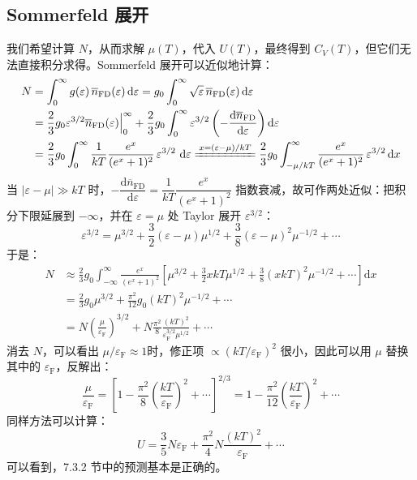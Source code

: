 \subsection{Sommerfeld 展开}
我们希望计算 $N$，从而求解 $\mu(T)$，代入 $U(T)$，最终得到 $C_V(T)$，但它们无法直接积分求得。Sommerfeld 展开可以近似地计算：
\begin{equation}
    \begin{split}
        N
        &=\int_0^{\infty}g(\varepsilon)\,\overline n_{\mathrm{FD}}(\varepsilon)\,\mathrm{d}\varepsilon
        =g_0\int_0^{\infty}\sqrt{\varepsilon}\,\overline n_{\mathrm{FD}}(\varepsilon)\,\mathrm{d}\varepsilon\\
        &=\frac{2}{3}g_0\varepsilon^{3/2}\overline n_{\mathrm{FD}}(\varepsilon)\Big|_0^{\infty}+\frac{2}{3}g_0\int_0^{\infty}\varepsilon^{3/2}\left(-\frac{\mathrm{d}\overline n_{\mathrm{FD}}}{\mathrm{d}\varepsilon}\right)\mathrm{d}\varepsilon\\
        &=\frac{2}{3}g_0\int_0^{\infty}\frac{1}{kT}\frac{e^x}{(e^x+1)^2}\,\varepsilon^{3/2}\,\,\mathrm{d}\varepsilon \xlongequal{x=(\varepsilon-\mu)/kT}\frac{2}{3}g_0\int_{-\mu/kT}^{\infty}\frac{e^x}{(e^x+1)^2}\,\varepsilon^{3/2}\,\mathrm{d}x
    \end{split}
\end{equation}
当 $|\varepsilon-\mu|\gg kT$ 时，$-\dfrac{\mathrm{d}\overline n_{\mathrm{FD}}}{\mathrm{d}\varepsilon}=\dfrac{1}{kT}\dfrac{e^x}{(e^x+1)^2}$ 指数衰减，故可作两处近似：把积分下限延展到 $-\infty$，并在 $\varepsilon=\mu$ 处 Taylor 展开 $\varepsilon^{3/2}$：
\begin{equation}
    \varepsilon^{3/2}=\mu^{3/2}+\frac{3}{2}(\varepsilon-\mu)\mu^{1/2}+\frac{3}{8}(\varepsilon-\mu)^2\mu^{-1/2}+\cdots
\end{equation}
于是：
\begin{equation}
    \begin{split}
        N
        &\approx \frac{2}{3}g_0\int_{-\infty}^{\infty}\frac{e^x}{(e^x+1)^2}\left[\mu^{3/2}+\frac{3}{2}xkT\mu^{1/2}+\frac{3}{8}(xkT)^2\mu^{-1/2}+\cdots\right]\mathrm{d}x\\
        &=\frac{2}{3}g_0\mu^{3/2}+\frac{\pi^2}{12}g_0(kT)^2\mu^{-1/2}+\cdots\\
        &= N\left(\frac{\mu}{\varepsilon_\mathrm{F}}\right)^{3/2}+N\frac{\pi^2}{8}\frac{(kT)^2}{\varepsilon_\mathrm{F}^{3/2}\mu^{1/2}}+\cdots
    \end{split}
\end{equation}
消去 $N$，可以看出 $\mu/\varepsilon_\mathrm{F}\approx 1$时，修正项 $\propto (kT/\varepsilon_\mathrm{F})^2$ 很小，因此可以用 $\mu$ 替换其中的 $\varepsilon_\mathrm{F}$，反解出：
\begin{equation}
    \frac{\mu}{\varepsilon_\mathrm{F}}=\left[1-\frac{\pi^2}{8}\left(\frac{kT}{\varepsilon_\mathrm{F}}\right)^2+\cdots\right]^{2/3}
    =1-\frac{\pi^2}{12}\left(\frac{kT}{\varepsilon_\mathrm{F}}\right)^2+\cdots
\end{equation}
同样方法可以计算：
\begin{equation}
    U=\frac{3}{5}N\varepsilon_\mathrm{F}+\frac{\pi^2}{4}N\frac{(kT)^2}{\varepsilon_\mathrm{F}}+\cdots
\end{equation}
可以看到，7.3.2 节中的预测基本是正确的。

